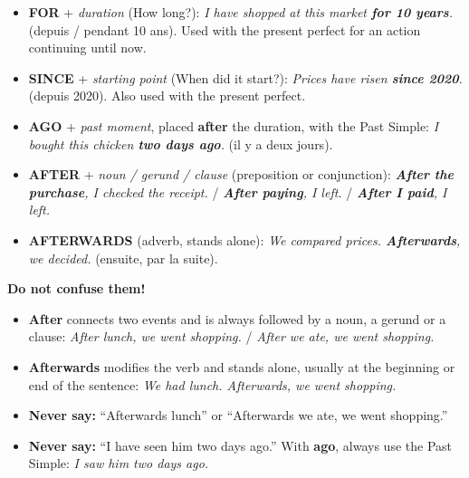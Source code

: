 \documentclass[11pt]{article}
\begin{document}
\begin{propriete}
\begin{itemize}
\item \textbf{FOR} + \emph{duration} (How long?): \textit{I have shopped at this market \textbf{for 10 years}.} (depuis / pendant 10 ans). Used with the present perfect for an action continuing until now.
\item \textbf{SINCE} + \emph{starting point} (When did it start?): \textit{Prices have risen \textbf{since 2020}.} (depuis 2020). Also used with the present perfect.
\item \textbf{AGO} + \emph{past moment}, placed \textbf{after} the duration, with the Past Simple: \textit{I bought this chicken \textbf{two days ago}.} (il y a deux jours).
\item \textbf{AFTER} + \emph{noun / gerund / clause} (preposition or conjunction): \textit{\textbf{After the purchase}, I checked the receipt.} / \textit{\textbf{After paying}, I left.} / \textit{\textbf{After I paid}, I left.}
\item \textbf{AFTERWARDS} (adverb, stands alone): \textit{We compared prices. \textbf{Afterwards}, we decided.} (ensuite, par la suite).
\end{itemize}
\end{propriete}

\begin{attention}
\textbf{Do not confuse them!}
\begin{itemize}
\item \textbf{After} connects two events and is always followed by a noun, a gerund or a clause: \textit{After lunch, we went shopping.} / \textit{After we ate, we went shopping.}
\item \textbf{Afterwards} modifies the verb and stands alone, usually at the beginning or end of the sentence: \textit{We had lunch. Afterwards, we went shopping.}
\item \textbf{Never say:} ``Afterwards lunch'' or ``Afterwards we ate, we went shopping.''
\item \textbf{Never say:} ``I have seen him two days ago.'' With \textbf{ago}, always use the Past Simple: \textit{I saw him two days ago.}
\end{itemize}
\end{attention}
\end{document}
